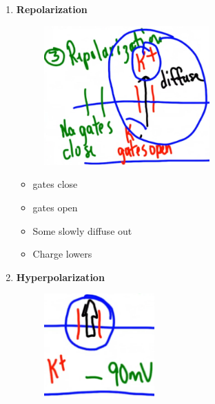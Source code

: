 \documentclass[a4paper,12pt]{article}
\begin{document}
\begin{enumerate}
{\begin{figure}[H]
            \end{figure}
            \begin{itemize}
                \item{ gates close}
                \item{ gates open,  flood in}
                \item{Charge jumps to +\SI{40}{\mV}}
            \end{itemize}
        }
    \item{
            \textbf{Repolarization}
            \begin{figure}[H]
                \centering
                \includegraphics[width=0.60\textwidth]{n3}
            \end{figure}
            \begin{itemize}
                \item{ gates close}
                \item{ gates open}
                \item{Some  slowly diffuse out}
                \item{Charge lowers}
            \end{itemize}
        }
    \item{
            \textbf{Hyperpolarization}
            \begin{figure}[H]
                \centering
                \includegraphics[width=0.40\textwidth]{n4}

\end{figure}}
\end{enumerate}
\end{document}
